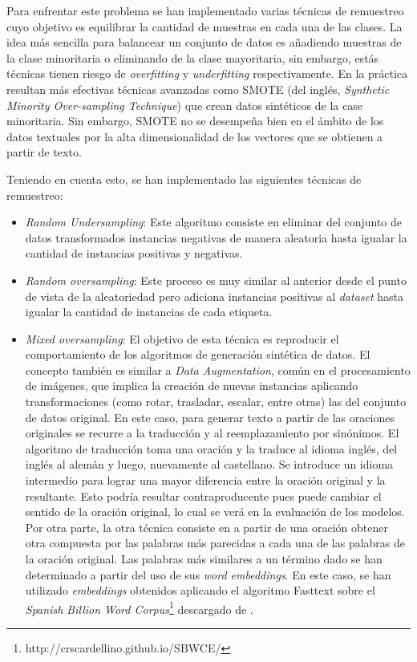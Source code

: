 Para enfrentar este problema se han implementado varias técnicas de remuestreo cuyo objetivo es equilibrar la cantidad de muestras en cada una de las clases. La idea más sencilla para balancear un conjunto de datos es añadiendo muestras de la clase minoritaria o eliminando de la clase mayoritaria, sin embargo, estás técnicas tienen riesgo de \textit{overfitting} y \textit{underfitting} respectivamente. En la práctica resultan más efectivas técnicas avanzadas como SMOTE (del inglés, \textit{Synthetic Minority Over-sampling Technique}) que crean datos sintéticos de la case minoritaria. Sin embargo, SMOTE no se desempeña bien en el ámbito de los datos textuales por la alta dimensionalidad de los vectores que se obtienen a partir de texto.

Teniendo en cuenta esto, se han implementado las siguientes técnicas de remuestreo:

\begin{itemize}
  \item \textit{Random Undersampling}: Este algoritmo consiste en eliminar del conjunto de datos transformados instancias negativas de manera aleatoria hasta igualar la cantidad de instancias positivas y negativas.
  \item \textit{Random oversampling}: Este proceso es muy similar al anterior desde el punto de vista de la aleatoriedad pero adiciona instancias positivas al \textit{dataset} hasta igualar la cantidad de instancias de cada etiqueta.
  \item \textit{Mixed oversampling}: El objetivo de esta técnica es reproducir el comportamiento de los algoritmos de generación sintética de datos. El concepto también es similar a \textit{Data Augmentation}, común en el procesamiento de imágenes, que implica la creación de nuevas instancias aplicando transformaciones (como rotar, trasladar, escalar, entre otras) las del conjunto de datos original. En este caso, para generar texto a partir de las oraciones originales se recurre a la traducción y al reemplazamiento por sinónimos. El algoritmo de traducción toma una oración y la traduce al idioma inglés, del inglés al alemán y luego, nuevamente al castellano. Se introduce un idioma intermedio para lograr una mayor diferencia entre la oración original y la resultante. Esto podría resultar contraproducente pues puede cambiar el sentido de la oración original, lo cual se verá en la evaluación de los modelos. Por otra parte, la otra técnica consiste en a partir de una oración obtener otra compuesta por las palabras más parecidas a cada una de las palabras de la oración original. Las palabras más similares a un término dado se han determinado a partir del uso de sus \textit{word embeddings}. En este caso, se han utilizado \textit{embeddings} obtenidos aplicando el algoritmo Fasttext sobre el \textit{Spanish Billion Word Corpus}\footnote{http://crscardellino.github.io/SBWCE/} descargado de \cite{spanish-word-embeddings}. 
\end{itemize}

